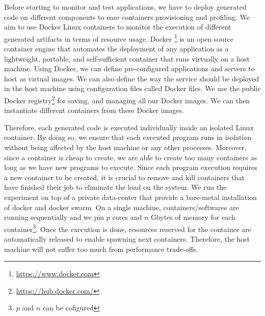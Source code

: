Before starting to monitor and test applications, we have to deploy generated code on different components to ease containers provisioning and profiling. 
We aim to use Docker Linux containers to monitor the execution of different generated artifacts in terms of resource usage. 
Docker \footnote{\url{https://www.docker.com}} is an open source container engine that automates the deployment of any application as a lightweight, portable, and self-sufficient container that runs virtually on a host machine. 
Using Docker, we can define pre-configured applications and servers to host as virtual images. We can also define the way the service should be deployed in the host machine using configuration files called Docker files. 
We use the public Docker registry\footnote{\url{https://hub.docker.com/}} for  saving, and managing all our Docker images. 
We can then instantiate different containers from these Docker images. 

Therefore, each generated code is executed individually inside an isolated Linux container. By doing so, we ensure that each executed program runs in isolation without being affected by the host machine or any other processes. Moreover, since a container is cheap to create, we are able to create too many containers as long as we have new programs to execute.  
Since each program execution requires a new container to be created, it is crucial to remove and kill containers that have finished their job to eliminate the load on the system. We run the experiment on top of a private data-center that provide a bare-metal installation of  docker and docker swarm. On a single machine,  containers/softwares are running sequentially and we pin $p$ cores and $n$ Gbytes of memory for each container\footnote{$p$ and $n$ can be cofigured}. Once the execution is done, resources reserved for the container are automatically released to enable spawning next containers. Therefore, the host machine will not suffer too much from performance trade-offs.

